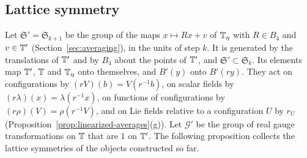 \subsection{Lattice symmetry}\label{ss:31.4}

Let $\mathfrak S'=\mathfrak S_{k+1}$ be the group of the maps $x\mapsto Rx+v$ of $\mathbb T_\eta$ with $R\in B_4$ and $v\in\mathbb T'$ (Section~\ref{sec:averaging}), in the units of step $k$. It is generated by the translations of $\mathbb T'$ and by $B_4$ about the points of $\mathbb T'$, and $\mathfrak S'\subset\mathfrak S_k$. Its elements map $\mathbb T'$, $\mathbb T$ and $\mathbb T_\eta$ onto themselves, and $B'(y)$ onto $B'(ry)$. They act on configurations by $(rV)(b)=V(r^{-1}b)$, on scalar fields by $(r\lambda)(x)=\lambda(r^{-1}x)$, on functions of configurations by $(r\rho)(V)=\rho(r^{-1}V)$, and on Lie fields relative to a configuration $U$ by $r_U$ (Proposition~\ref{prop:linearized-averages}(g)). Let $\mathcal G'$ be the group of real gauge transformations on $\mathbb T$ that are $1$ on $\mathbb T'$. The following proposition collects the lattice symmetries of the objects constructed so far.

